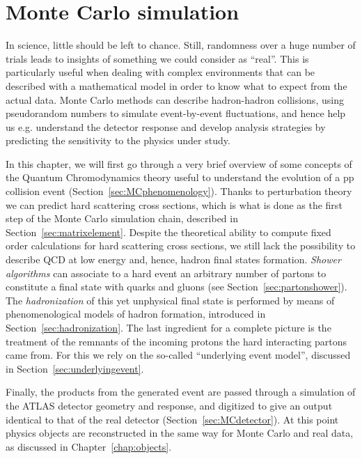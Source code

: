 \clearpage{\pagestyle{empty}\cleardoublepage}

\chapter{Monte Carlo simulation}\label{chap:mc}

In science, little should be left to chance. Still, randomness
over a huge number of trials leads to insights of something we could
consider as ``real''. This is particularly useful when dealing with 
complex environments that can be described with a mathematical model
in order to know what to expect from the actual data.
Monte Carlo methods can describe hadron-hadron collisions,
using pseudorandom numbers to simulate event-by-event fluctuations, and
hence help us e.g. understand the detector response and develop analysis
strategies by predicting the sensitivity to the physics under study.

In this chapter, we will first go through a very brief overview of some concepts of the 
Quantum Chromodynamics theory useful to understand the evolution of a pp collision
event (Section~\ref{sec:MCphenomenology}). Thanks to perturbation theory we can predict hard 
scattering cross sections, which is what is done as the first step of the Monte Carlo 
simulation chain, described in Section~\ref{sec:matrixelement}.
Despite the theoretical ability to compute fixed order calculations for hard scattering cross sections,
we still lack the possibility to describe QCD at low energy and, hence, hadron final states formation. 
{\it Shower algorithms} can associate to a hard event an arbitrary number of partons to constitute
a final state with quarks and gluons (see Section~\ref{sec:partonshower}). 
The {\it hadronization} of this yet unphysical final state is
performed by means of phenomenological models of hadron formation, introduced in Section~\ref{sec:hadronization}. 
The last ingredient for a complete picture is the treatment of
the remnants of the incoming protons the hard interacting partons
came from. For this we rely on the so-called ``underlying event model'', discussed in 
Section~\ref{sec:underlyingevent}.

Finally, the products from the generated event are passed through a simulation of the ATLAS
detector geometry and response, and digitized to give an output identical to 
that of the real detector (Section~\ref{sec:MCdetector}).
At this point physics objects are reconstructed in the same way for Monte Carlo
and real data, as discussed in Chapter~\ref{chap:objects}.
 

